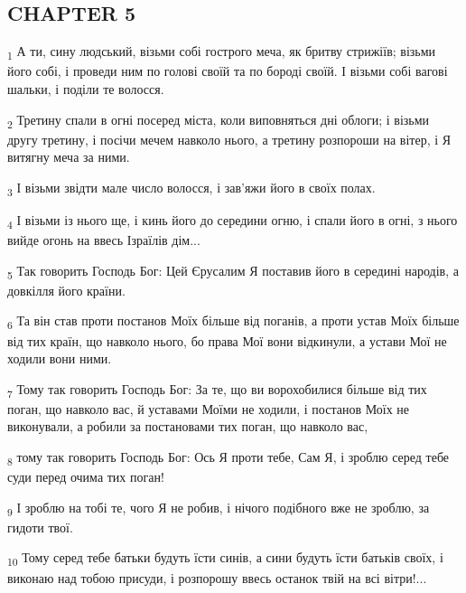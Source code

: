 \subsection{CHAPTER 5}
\begin{tcolorbox}
\textsubscript{1} А ти, сину людський, візьми собі гострого меча, як бритву стрижіїв; візьми його собі, і проведи ним по голові своїй та по бороді своїй. І візьми собі вагові шальки, і поділи те волосся.
\end{tcolorbox}
\begin{tcolorbox}
\textsubscript{2} Третину спали в огні посеред міста, коли виповняться дні облоги; і візьми другу третину, і посічи мечем навколо нього, а третину розпороши на вітер, і Я витягну меча за ними.
\end{tcolorbox}
\begin{tcolorbox}
\textsubscript{3} І візьми звідти мале число волосся, і зав'яжи його в своїх полах.
\end{tcolorbox}
\begin{tcolorbox}
\textsubscript{4} І візьми із нього ще, і кинь його до середини огню, і спали його в огні, з нього вийде огонь на ввесь Ізраїлів дім...
\end{tcolorbox}
\begin{tcolorbox}
\textsubscript{5} Так говорить Господь Бог: Цей Єрусалим Я поставив його в середині народів, а довкілля його країни.
\end{tcolorbox}
\begin{tcolorbox}
\textsubscript{6} Та він став проти постанов Моїх більше від поганів, а проти устав Моїх більше від тих країн, що навколо нього, бо права Мої вони відкинули, а устави Мої не ходили вони ними.
\end{tcolorbox}
\begin{tcolorbox}
\textsubscript{7} Тому так говорить Господь Бог: За те, що ви ворохобилися більше від тих поган, що навколо вас, й уставами Моїми не ходили, і постанов Моїх не виконували, а робили за постановами тих поган, що навколо вас,
\end{tcolorbox}
\begin{tcolorbox}
\textsubscript{8} тому так говорить Господь Бог: Ось Я проти тебе, Сам Я, і зроблю серед тебе суди перед очима тих поган!
\end{tcolorbox}
\begin{tcolorbox}
\textsubscript{9} І зроблю на тобі те, чого Я не робив, і нічого подібного вже не зроблю, за гидоти твої.
\end{tcolorbox}
\begin{tcolorbox}
\textsubscript{10} Тому серед тебе батьки будуть їсти синів, а сини будуть їсти батьків своїх, і виконаю над тобою присуди, і розпорошу ввесь останок твій на всі вітри!...
\end{tcolorbox}
